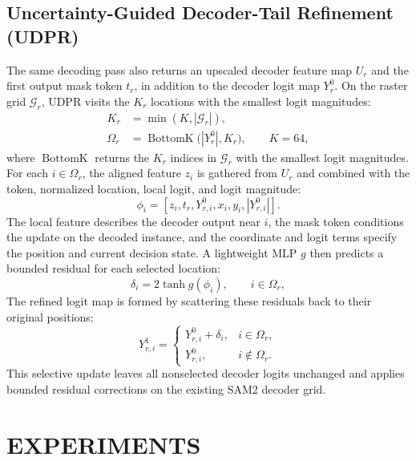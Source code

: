 \documentclass{article}
\begin{document}
\subsection{Uncertainty-Guided Decoder-Tail Refinement (UDPR)}
The same decoding pass also returns an upscaled decoder feature map $U_r$ and
the first output mask token $t_r$, in addition to the decoder logit map $Y_r^0$.
On the raster grid $\mathcal{G}_r$, UDPR visits the $K_r$ locations with
the smallest logit magnitudes:
\begin{equation}
\begin{aligned}
K_r&=\min(K,|\mathcal{G}_r|),\\
\Omega_r&=\operatorname{BottomK}\bigl(|Y_r^0|,K_r\bigr),\qquad K=64,
\end{aligned}
\label{eq:udpr-selection}
\end{equation}
where $\operatorname{BottomK}$ returns the $K_r$ indices in $\mathcal{G}_r$
with the smallest logit magnitudes.
For each $i\in\Omega_r$, the aligned feature $z_i$ is gathered from $U_r$ and
combined with the token, normalized location, local logit, and logit magnitude:
\begin{equation}
\phi_i=[z_i,t_r,Y^0_{r,i},x_i,y_i,|Y^0_{r,i}|].
\label{eq:udpr-input}
\end{equation}
The local feature describes the decoder output near $i$, the mask token
conditions the update on the decoded instance, and the coordinate and logit
terms specify the position and current decision state. A lightweight MLP $g$
then predicts a bounded residual for each selected location:
\begin{equation}
\delta_i=2\tanh g(\phi_i),\qquad i\in\Omega_r,
\label{eq:udpr}
\end{equation}
The refined logit map is formed by scattering these residuals back to their
original positions:
\begin{equation}
Y^1_{r,i}=\begin{cases}
Y^0_{r,i}+\delta_i, & i\in\Omega_r,\\
Y^0_{r,i}, & i\notin\Omega_r.
\end{cases}
\label{eq:udpr-scatter}
\end{equation}
This selective update leaves all nonselected decoder logits unchanged and
applies bounded residual corrections on the existing SAM2 decoder grid.

\section{EXPERIMENTS}
\end{document}
